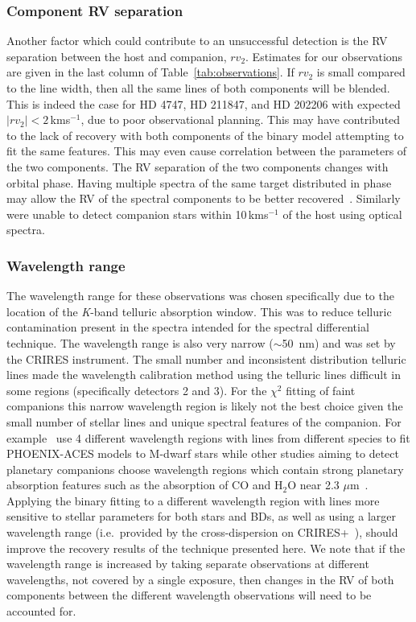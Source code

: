 \documentclass[fleqn,usenatbib]{mnras}
\newcommand{\kmps}{\,kms\(^{-1}\)}	%
\begin{document}
\subsubsection{Component RV separation}
\label{subsubsec:rv_seperation}
Another factor which could contribute to an unsuccessful detection is the RV separation between the host and companion, \(rv_2\). Estimates for our observations are given in the last column of Table~\ref{tab:observations}. If \({rv}_2\) is small compared to the line width, then all the same lines of both components will be blended. This is indeed the case for {HD 4747}, {HD 211847}, and {HD 202206} with expected \(|{rv}_2| < 2\)\kmps{}, {due to poor observational planning}. This may have contributed to the lack of recovery with both components of the binary model attempting to fit the same features. This may even cause correlation between the parameters of the two components. The RV separation of the two components changes with orbital phase. Having multiple spectra of the same target distributed in phase may allow the RV of the spectral components to be better recovered~\citep[e.g.][]{czekala_disentangling_2017, sablowski_spectral_2016}.
{Similarly~\citet{kolbl_detection_2015} were unable to detect companion stars within 10\kmps{} of the host using optical spectra}.

\subsubsection{Wavelength range}
\label{subsubsec:wavelenght_range_limitation}
{The wavelength range for these observations was chosen specifically due to the location of the \textit{K}-band telluric absorption window. This was to reduce telluric contamination present in the spectra intended for the spectral differential technique. The wavelength range is also very narrow (\(\sim\)50~nm) and was set by the CRIRES instrument. The small number and inconsistent distribution telluric lines made the wavelength calibration method using the telluric lines difficult in some regions (specifically detectors 2 and 3). For the $\chi^2$ fitting of faint companions this narrow wavelength region is likely not the best choice given the small number of stellar lines and unique spectral features of the companion. For example~\citet{passegger_fundamental_2016} use 4 different wavelength regions with lines from different species to fit PHOENIX-ACES models to M-dwarf stars while other studies aiming to detect planetary companions choose wavelength regions which contain strong planetary absorption features such as the absorption of CO and H$_2$O near 2.3 $\mu$m~\citep[e.g.][]{dekok_detection_2013, brogi_carbon_2014}.
Applying the binary fitting to a different wavelength region with lines more sensitive to stellar parameters for both stars and BDs, as well as using a larger wavelength range (i.e.\ provided by the cross-dispersion on CRIRES+~\citep{dorn_crires_2016}), should improve the recovery results of the technique presented here. We note that if the wavelength range is increased by taking separate observations at different wavelengths, not covered by a single exposure, then changes in the RV of both components between the different wavelength observations will need to be accounted for.}
\end{document}
